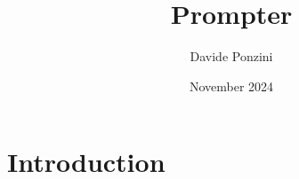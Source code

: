 \documentclass{article}
\title{Prompter}
\author{Davide Ponzini}
\date{November 2024}
\begin{document}
\maketitle

\section{Introduction}
\end{document}
